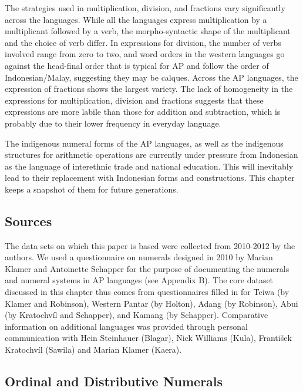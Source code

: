 The strategies used in multiplication, division, and fractions vary significantly across the languages. While all the languages express multiplication by a multiplicant followed by a verb, the morpho-syntactic shape of the multiplicant and the choice of verb differ. In expressions for division, the number of verbs involved range from zero to two, and word orders in the western languages go against the head-final order that is typical for AP and follow the order of Indonesian/Malay, suggesting they may be calques. Across the AP languages, the expression of fractions shows the largest variety. The lack of homogeneity in the expressions for multiplication, division and fractions suggests that these expressions are more labile than those for addition and subtraction, which is probably due to their lower frequency in everyday language.

The indigenous numeral forms of the AP languages, as well as the indigenous structures for arithmetic operations are currently under pressure from Indonesian as the language of interethnic trade and national education. This will inevitably lead to their replacement with Indonesian forms and constructions. This chapter keeps a snapshot of them for future generations. 

\subsection{Sources}
\label{sec:8:Sources}
The data sets on which this paper is based were collected from 2010-2012 by the authors. We used a questionnaire on numerals designed in 2010 by Marian Klamer and Antoinette Schapper for the purpose of documenting the numerals and numeral systems in AP languages (see Appendix B). The core dataset discussed in this chapter thus comes from questionnaires filled in for Teiwa (by Klamer and Robinson), Western Pantar (by Holton), Adang (by Robinson), Abui (by Kratochv\'il and Schapper), and Kamang (by Schapper). Comparative information on additional languages was provided through personal communication with Hein Steinhauer (Blagar), Nick Williams (Kula), Franti{\v{s}}ek Kratochv\'il (Sawila) and Marian Klamer (Kaera).

\startappendix
\subsection{Ordinal and Distributive Numerals} 

